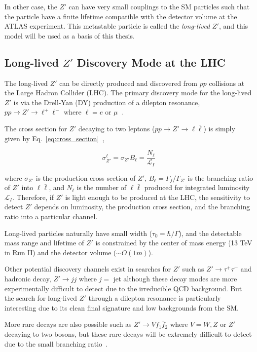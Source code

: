 In other case, the $Z'$ can have very small couplings to the SM particles such that the particle have a finite lifetime compatible with the detector volume at the ATLAS experiment. This metastable particle is called the \textit{long-lived} $Z'$, and this model will be used as a basis of this thesis.



\subsection{Long-lived \texorpdfstring{$Z'$}{Z'} Discovery Mode at the LHC}
\label{sec:intro:zprime_discovery}

The long-lived $Z'$ can be directly produced and discovered from $pp$ collisions at the Large Hadron Collider (LHC). The primary discovery mode for the long-lived $Z'$ is via the Drell-Yan (DY) production of a dilepton resonance, $pp \rightarrow Z' \rightarrow  \ell^{+}\ell^{-}$ where $\ell= e$ or $\mu$~\cite{0034-4885-45-11-002}.

The cross section for $Z'$ decaying to two leptons ($pp \rightarrow Z' \rightarrow \ell \bar{\ell}$) is simply given by Eq.~\ref{eq:cross_section}~\cite{Langacker:2009su},

\begin{equation}
\label{eq:cross_section}
\sigma^{\ell}_{Z'} = \sigma_{Z'} B_{\ell} = \frac{N_{\ell}}{\mathcal{L}_{I}}
\end{equation}

where $\sigma_{Z'}$ is the production cross section of $Z'$, $B_{\ell} = \Gamma_{f} / \Gamma_{Z'}$ is the branching ratio of $Z'$ into $\ell\bar{\ell}$, and $N_{\ell}$ is the number of $\ell\bar{\ell}$ produced for integrated luminosity $\mathcal{L}_{I}$. Therefore, if $Z'$ is light enough to be produced at the LHC, the sensitivity to detect $Z'$ depends on luminosity, the production cross section, and the branching ratio into a particular channel.

Long-lived particles naturally have small width ($\tau_{0} = \hbar / \Gamma$), and the detectable mass range and lifetime of $Z'$ is constrained by the center of mass energy (13 TeV in Run II) and the detector volume ($\sim O(1m)$). 

Other potential discovery channels exist in searches for $Z'$ such as $Z' \rightarrow \tau^{+}\tau^{-}$ and hadronic decay, $Z' \rightarrow jj$ where $j =$ jet although these decay modes are more experimentally difficult to detect due to the irreducible QCD background. But the search for long-lived $Z'$ through a dilepton resonance is particularly interesting due to its clean final signature and low backgrounds from the SM.

More rare decays are also possible such as $Z' \rightarrow V f_{1} \bar{f}_{2}$ where $V = W, Z$ or $Z'$ decaying to two bosons, but these rare decays will be extremely difficult to detect due to the small branching ratio~\cite{Langacker:2009su}.

